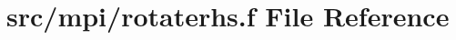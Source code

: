 \hypertarget{mpi_2rotaterhs_8f}{\section{src/mpi/rotaterhs.f File Reference}
\label{mpi_2rotaterhs_8f}
}
